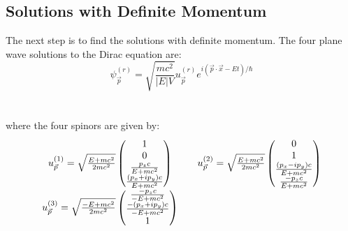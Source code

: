 \documentclass{report}
\begin{document}
\subsection{Solutions with Definite Momentum}
The next step is to find the solutions with definite momentum. The four plane wave solutions to the Dirac equation are:
\begin{equation}
	\psi^{(r)}_{\vec{p}} = \sqrt{\frac{mc^2}{\left| E \right|V }}u^{(r)} _{\vec{p}}e^{i\left( \vec{p} \cdot \vec{x} - Et \right) / \hbar }
\end{equation}\\ \\
where the four spinors are given by:
\begin{equation}
	\begin{array}{c@{\qquad}c}
		u_{\vec{p}}^{(1)} = \sqrt{\frac{E + mc^2}{2mc^2}} \begin{pmatrix}
			                                                  1                    \\
			                                                  0                    \\
			                                                  \frac{p_z c}{E+mc^2} \\
			                                                  \frac{(p_x+ip_y)c}{E+mc^2}
		                                                  \end{pmatrix}
		 &
		u_{\vec{p}}^{(2)} = \sqrt{\frac{E + mc^2}{2mc^2}} \begin{pmatrix}
			                                                  0                          \\
			                                                  1                          \\
			                                                  \frac{(p_x-ip_y)c}{E+mc^2} \\
			                                                  \frac{-p_z c}{E+mc^2}
		                                                  \end{pmatrix}
		\\[3ex]
		u_{\vec{p}}^{(3)} = \sqrt{\frac{-E + mc^2}{2mc^2}} \begin{pmatrix}
			                                                   \frac{-p_z c}{-E+mc^2}       \\
			                                                   \frac{-(p_x+ip_y)c}{-E+mc^2} \\
			                                                   1                            \\

\end{pmatrix}
\end{array}
\end{equation}
\end{document}
